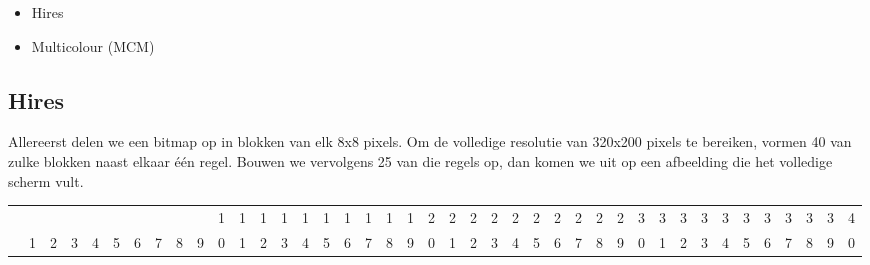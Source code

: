 \begin{itemize}
	\item Hires	\item Multicolour (MCM)
\end{itemize}


\subsection*{Hires}

Allereerst delen we een bitmap op in blokken van elk 8x8 pixels. Om de volledige resolutie van 320x200 pixels te bereiken, vormen 40 van zulke blokken naast elkaar één regel. Bouwen we vervolgens 25 van die regels op, dan komen we uit op een afbeelding die het volledige scherm vult.

\begin{adjustbox}{width=\textwidth,center}
\begin{footnotesize}
\begin{tabular}[h]{|C{10pt}|C{5pt}|C{5pt}|C{5pt}|C{5pt}|C{5pt}|C{5pt}|C{5pt}|C{5pt}|C{5pt}|C{5pt}|C{5pt}|C{5pt}|C{5pt}|C{5pt}|C{5pt}|C{5pt}|C{5pt}|C{5pt}|C{5pt}|C{5pt}|C{5pt}|C{5pt}|C{5pt}|C{5pt}|C{5pt}|C{5pt}|C{5pt}|C{5pt}|C{5pt}|C{5pt}|C{5pt}|C{5pt}|C{5pt}|C{5pt}|C{5pt}|C{5pt}|C{5pt}|C{5pt}|C{5pt}|C{5pt}|}
\hline
  &   &   &  &  &  &   &   &   &   & 1  & 1  & 1  & 1  & 1  & 1  & 1  & 1  & 1  & 1  & 2  & 2  & 2  & 2  & 2  & 2  & 2  & 2  & 2  & 2  & 3  & 3  & 3  & 3  & 3  & 3  & 3  & 3  & 3  & 3  & 4  \\  & 1 & 2 & 3& 4& 5& 6 & 7 & 8 & 9 &  0 & 1  &  2 &  3 &  4 &  5 &  6 &  7 &  8 &  9 &  0 &  1 &  2 &  3 &  4 &  5 &  6 &  7 &  8 &  9 &  0 &  1 &  2 &  3 &  4 &  5 &  6 &  7 &  8 &  9 &  0 \\
\hline

\end{tabular}
\end{footnotesize}
\end{adjustbox}
